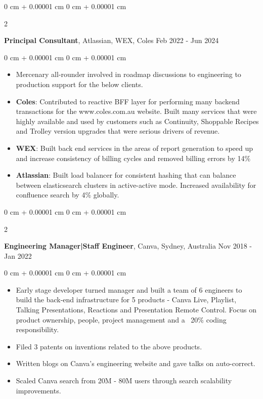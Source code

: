 \documentclass[10pt, letterpaper]{article}
\newenvironment{highlights}{
    \begin{itemize}[
        topsep=0.10 cm,
        parsep=0.10 cm,
        partopsep=0pt,
        itemsep=0pt,
        leftmargin=0 cm + 10pt
    ]
}{
    \end{itemize}
} %
\newenvironment{onecolentry}{
    \begin{adjustwidth}{
        0 cm + 0.00001 cm
    }{
        0 cm + 0.00001 cm
    }
}{
    \end{adjustwidth}
} %
\newenvironment{twocolentry}[2][]{
    \onecolentry
    \def\secondColumn{#2}
    \setcolumnwidth{\fill, 4.5 cm}
    \begin{paracol}{2}
}{
    \switchcolumn \raggedleft \secondColumn
    \end{paracol}
    \endonecolentry
} %
\begin{document}
        \vspace{0.15 cm}
        
        \begin{twocolentry}{
            Feb 2022 - Jun 2024
        }
        \textbf{Principal Consultant}, Atlassian, WEX, Coles\end{twocolentry}

        \vspace{0.10 cm}
        \begin{onecolentry}
            \begin{highlights}
                \item Mercenary all-rounder involved in roadmap discussions to engineering to production support for the below clients.
                \item \textbf{Coles}: Contributed to reactive BFF layer for performing many backend transactions for the www.coles.com.au website. Built many services that were highly available and used by customers such as Continuity, Shoppable Recipes and Trolley version upgrades that were serious drivers of revenue.
                \item \textbf{WEX}: Built back end services in the areas of report generation to speed up and increase consistency of billing cycles and removed billing errors by 14\%
                \item \textbf{Atlassian}: Built load balancer for consistent hashing that can balance between elasticsearch clusters in active-active mode. Increased availability for confluence search by 4\% globally.
            \end{highlights}
        \end{onecolentry}

        \vspace{0.15 cm}

        \begin{twocolentry}{
            Nov 2018 - Jan 2022
        }
            \textbf{Engineering Manager|Staff Engineer}, Canva, Sydney, Australia\end{twocolentry}

        \vspace{0.10 cm}
        \begin{onecolentry}
            \begin{highlights}
                \item Early stage developer turned manager and built a team of 6 engineers to build the back-end infrastructure for 5 products - Canva Live, Playlist, Talking Presentations, Reactions and Presentation Remote Control. Focus on product ownership, people, project management and a ~20\% coding responsibility.
                \item Filed 3 patents on inventions related to the above products.
                \item Written blogs on Canva's engineering website and gave talks on auto-correct.
                \item Scaled Canva search from 20M - 80M users through search scalability improvements.
            \end{highlights}
        \end{onecolentry}
\end{document}
